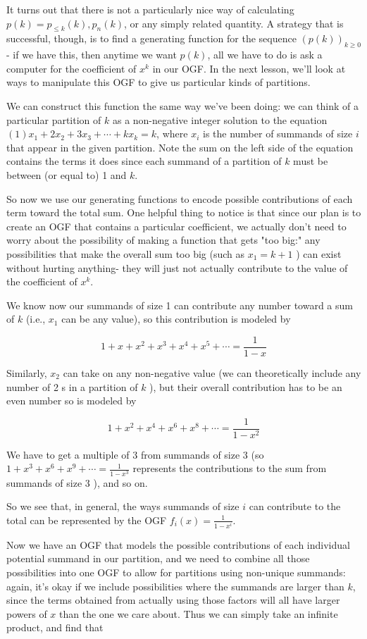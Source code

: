 \documentclass{article}
\theoremstyle{definition}
\begin{document}
It turns out that there is not a particularly nice way of calculating $p(k)=p_{\leq k}(k), p_{n}(k)$, or any simply related quantity. A strategy that is successful, though, is to find a generating function for the sequence $(p(k))_{k \geq 0}$ - if we have this, then anytime we want $p(k)$, all we have to do is ask a computer for the coefficient of $x^{k}$ in our OGF. In the next lesson, we'll look at ways to manipulate this OGF to give us particular kinds of partitions.

We can construct this function the same way we've been doing: we can think of a particular partition of $k$ as a non-negative integer solution to the equation $(1) x_{1}+2 x_{2}+3 x_{3}+\cdots+k x_{k}=k$, where $x_{i}$ is the number of summands of size $i$ that appear in the given partition. Note the sum on the left side of the equation contains the terms it does since each summand of a partition of $k$ must be between (or equal to) 1 and $k$.

So now we use our generating functions to encode possible contributions of each term toward the total sum. One helpful thing to notice is that since our plan is to create an OGF that contains a particular coefficient, we actually don't need to worry about the possibility of making a function that gets "too big:" any possibilities that make the overall sum too big (such as $x_{1}=k+1$ ) can exist without hurting anything- they will just not actually contribute to the value of the coefficient of $x^{k}$.

We know now our summands of size 1 can contribute any number toward a sum of $k$ (i.e., $x_{1}$ can be any value), so this contribution is modeled by

$$
1+x+x^{2}+x^{3}+x^{4}+x^{5}+\cdots=\frac{1}{1-x}
$$

Similarly, $x_{2}$ can take on any non-negative value (we can theoretically include any number of 2 s in a partition of $k$ ), but their overall contribution has to be an even number so is modeled by

$$
1+x^{2}+x^{4}+x^{6}+x^{8}+\cdots=\frac{1}{1-x^{2}}
$$

We have to get a multiple of 3 from summands of size 3 (so $1+x^{3}+x^{6}+x^{9}+\cdots=\frac{1}{1-x^{3}}$ represents the contributions to the sum from summands of size 3 ), and so on.

So we see that, in general, the ways summands of size $i$ can contribute to the total can be represented by the OGF $f_{i}(x)=\frac{1}{1-x^{i}}$.

Now we have an OGF that models the possible contributions of each individual potential summand in our partition, and we need to combine all those possibilities into one OGF to allow for partitions using non-unique summands: again, it's okay if we include possibilities where the summands are larger than $k$, since the terms obtained from actually using those factors will all have larger powers of $x$ than the one we care about. Thus we can simply take an infinite product, and find that
\end{document}
